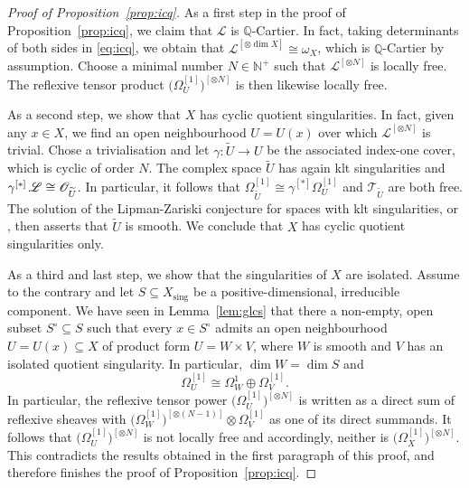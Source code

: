 \documentclass[11pt]{article}
\let\scr\mathscr
\theoremstyle{plain}
\theoremstyle{definition}
\numberwithin{equation}{thm}
\numberwithin{enumi}{thm}
\DeclareMathOperator{\sing}{sing}
\newcommand{\sL}{\scr{L}}
\newcommand{\sO}{\scr{O}}
\newcommand{\sT}{\scr{T}}
\newcommand{\bN}{\mathbb{N}}
\newcommand{\bQ}{\mathbb{Q}}
\let\wtilde\widetilde
\begin{document}
\begin{proof}[Proof of Proposition~\ref{prop:icq}]
As a first step in the proof of Proposition~\ref{prop:icq}, we claim that $\sL$
is $\bQ$-Cartier. In fact, taking determinants of both sides in \eqref{eq:icq},
we obtain that $\sL^{[\otimes \dim X]} \cong \omega_X$, which is $\bQ$-Cartier by assumption.
Choose a minimal number $N \in \bN^+$ such that $\sL^{[\otimes N]}$ is locally free. The
reflexive tensor product $\bigl(\Omega^{[1]}_U \bigr)^{[\otimes N]}$ is then likewise
locally free.

As a second step, we show that $X$ has cyclic quotient singularities. In
fact, given any $x \in X$, we find an open neighbourhood $U=U(x)$ over which
$\sL^{[\otimes N]}$ is trivial. Chose a trivialisation and let $\gamma: \wtilde{U} \to U$ be
the associated index-one cover, which is cyclic of order $N$. The complex
space $\wtilde{U}$ has again klt singularities and
$\gamma^{[*]}\, \sL \cong\nobreak \sO_{\wtilde{U}}$. In particular, it follows that
$\Omega^{[1]}_{\wtilde{U}} \cong \gamma^{[*]} \Omega^{[1]}_U$ and $\sT_{\wtilde U}$ are both free.
The solution of the Lipman-Zariski conjecture for spaces with klt
singularities, \cite[Th.\,3.8 \& comments after Th.\,1.1]{Druel13a} or
\cite[Th.\,1.13]{KS18}, then asserts that $\wtilde{U}$ is smooth. We conclude
that $X$ has cyclic quotient singularities only.

As a third and last step, we show that the singularities of $X$ are isolated.
Assume to the contrary and let $S \subseteq X_{\sing}$ be a positive-dimensional,
irreducible component. We have seen in Lemma~\ref{lem:glcs} that there a
non-empty, open subset $S^\circ \subseteq S$ such that every $x \in S^\circ$ admits an open
neighbourhood $U = U(x) \subseteq X$ of product form $U = W \times V$, where $W$ is smooth
and $V$ has an isolated quotient singularity. In particular,
$\dim W = \dim S$ and
\[
\Omega^{[1]}_U \cong \Omega^1_W \oplus \Omega^{[1]}_V.
\]
In particular, the reflexive tensor power $\bigl(\Omega^{[1]}_U \bigr)^{[\otimes N]}$ is
written as a direct sum of reflexive sheaves with
$\bigl(\Omega^{[1]}_W \bigr)^{[\otimes (N-1)]} \otimes \Omega^{[1]}_V$ as one of its direct
summands. It follows that $\bigl(\Omega^{[1]}_U \bigr)^{[\otimes N]}$ is not locally
free and accordingly, neither is $\bigl(\Omega^{[1]}_X \bigr)^{[\otimes N]}$. This
contradicts the results obtained in the first paragraph of this proof, and
therefore finishes the proof of Proposition~\ref{prop:icq}.
\end{proof}
\end{document}
